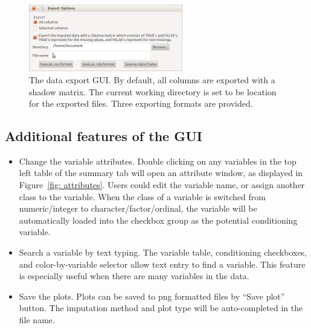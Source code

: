 \documentclass[article]{jss}
\begin{document}
\begin{center}
\begin{figure}[!h]
\begin{centering}
\includegraphics[width=0.6\textwidth]{graph/fig7-export}
\par\end{centering}
\caption{The data export GUI. By default, all columns are
exported with a shadow matrix. The current working directory
is set to be location for the exported files. Three
exporting formats are provided.}
\label{fig: export}
\end{figure}
\par\end{center}


\subsection{Additional features of the GUI}

\begin{itemize}
\item Change the variable attributes. Double clicking on any
variables in the top left table of the summary tab will open
an attribute window, as displayed in Figure~\ref{fig: attributes}.
Users could edit the variable name, or assign another class
to the variable. When the class of a variable is switched
from numeric/integer to character/factor/ordinal, the variable
will be automatically loaded into the checkbox group as the
potential conditioning variable.
\item Search a variable by text typing. The variable table,
conditioning checkboxes, and color-by-variable selector allow
text entry to find a variable. This feature is especially
useful when there are many variables in the data.
\item Save the plots. Plots can be saved to png formatted files
by ``Save plot'' button. The imputation method and plot type
will be auto-completed in the file name.
\end{itemize}
\end{document}
